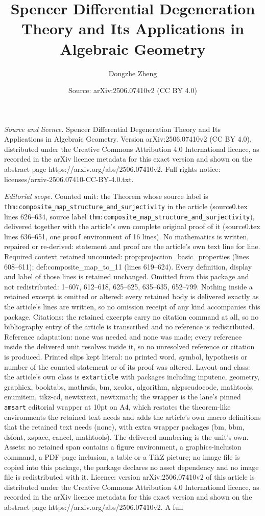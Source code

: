 \documentclass[10pt,a4paper]{amsart}
\title[Spencer Differential Degeneration Theory and Its Application]{Spencer Differential Degeneration Theory and Its Applications in Algebraic Geometry}
\author{Dongzhe Zheng}
\date{Source: arXiv:2506.07410v2 (CC BY 4.0)}
\begin{document}
\maketitle

\noindent\emph{Source and licence.} Spencer Differential Degeneration Theory and Its Applications in Algebraic Geometry. Version arXiv:2506.07410v2 (CC BY 4.0), distributed under the Creative Commons Attribution 4.0 International licence, as recorded in the arXiv licence metadata for this exact version and shown on the abstract page https://arxiv.org/abs/2506.07410v2. Full rights notice: licenses/arxiv-2506.07410-CC-BY-4.0.txt.\par\smallskip

\noindent\textit{Editorial scope.} Counted unit: the Theorem whose source label is \texttt{thm:composite\_map\_structure\_and\_surjectivity} in the article (source0.tex lines 626--634, source label \texttt{thm:composite\_map\_structure\_and\_surjectivity}), delivered together with the article's own complete original proof of it (source0.tex lines 636--651, one \texttt{proof} environment of 16 lines). No mathematics is written, repaired or re-derived: statement and proof are the article's own text line for line. Required context retained uncounted: prop:projection\_basic\_properties (lines 608--611); def:composite\_map\_to\_11 (lines 619--624). Every definition, display and label of those lines is retained unchanged. Omitted from this package and not redistributed: 1--607, 612--618, 625--625, 635--635, 652--799. Nothing inside a retained excerpt is omitted or altered: every retained body is delivered exactly as the article's lines are written, so no omission receipt of any kind accompanies this package. Citations: the retained excerpts carry no citation command at all, so no bibliography entry of the article is transcribed and no reference is redistributed. Reference adaptation: none was needed and none was made; every reference inside the delivered unit resolves inside it, so no unresolved reference or citation is produced. Printed slips kept literal: no printed word, symbol, hypothesis or number of the counted statement or of its proof was altered. Layout and class: the article's own class is \texttt{extarticle} with packages including inputenc, geometry, graphicx, booktabs, mathrsfs, bm, xcolor, algorithm, algpseudocode, mathtools, enumitem, tikz-cd, newtxtext, newtxmath; the wrapper is the lane's pinned \texttt{amsart} editorial wrapper at 10pt on A4, which restates the theorem-like environments the retained text needs and adds the article's own macro definitions that the retained text needs (none), with extra wrapper packages (bm, bbm, dsfont, xspace, cancel, mathtools). The delivered numbering is the unit's own. Assets: no retained span contains a figure environment, a graphics-inclusion command, a PDF-page inclusion, a table or a TikZ picture; no image file is copied into this package, the package declares no asset dependency and no image file is redistributed with it. Licence: version arXiv:2506.07410v2 of this article is distributed under the Creative Commons Attribution 4.0 International licence, as recorded in the arXiv licence metadata for this exact version and shown on the abstract page https://arxiv.org/abs/2506.07410v2. A full 
\end{document}
